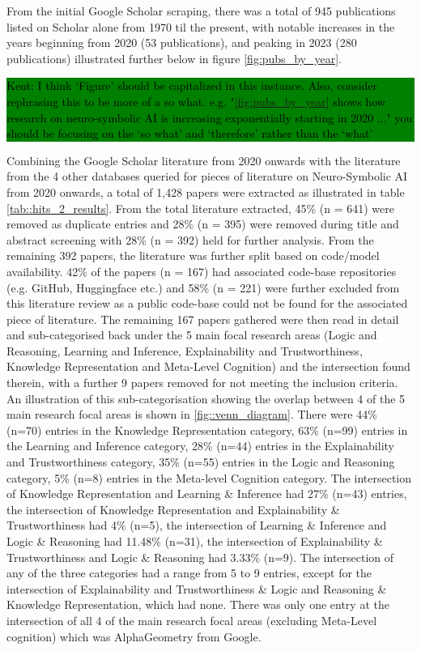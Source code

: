 \documentclass[hf]{ceurart}
\newcommand{\pinaforecomment}[4]{\colorbox{#1}{\textcolor{#4}{\parbox{.8\linewidth}{#2: #3}}}}
\newcommand{\osullikomment}[1]{\pinaforecomment{green}{Kent}{#1}{black}}
\begin{document}
From the initial Google Scholar scraping, there was a total of 945 publications listed on Scholar alone from 1970 til the present, with notable increases in the years beginning from 2020 (53 publications), and peaking in 2023 (280 publications) illustrated further below in figure \ref{fig:pubs_by_year}.
%
\osullikomment{I think `Figure' should be capitalized in this instance. Also, consider rephrasing this to be more of a so what. e.g. "\autoref{fig:pubs_by_year} shows how research on neuro-symbolic AI is increasing exponentially starting in 2020 ..." you should be focusing on the `so what' and `therefore' rather than the `what'} 
%
Combining the Google Scholar literature from 2020 onwards with the literature from the 4 other databases queried for pieces of literature on Neuro-Symbolic AI from 2020 onwards, a total of 1,428 papers were extracted as illustrated in table \ref{tab::hits_2_results}. From the total literature extracted, 45\% (n = 641) were removed as duplicate entries and 28\% (n = 395) were removed during title and abstract screening with 28\% (n = 392) held for further analysis. From the remaining 392 papers, the literature was further split based on code/model availability. 42\% of the papers (n = 167) had associated code-base repositories (e.g. GitHub, Huggingface etc.) and 58\% (n = 221) were further excluded from this literature review as a public code-base could not be found for the associated piece of literature. The remaining 167 papers gathered were then read in detail and sub-categorised back under the 5 main focal research areas (Logic and Reasoning, Learning and Inference, Explainability and Trustworthiness, Knowledge Representation and Meta-Level Cognition) and the intersection found therein, with a further 9 papers removed for not meeting the inclusion criteria. An illustration of this sub-categorisation showing the overlap between 4 of the 5 main research focal areas is shown in \autoref{fig::venn_diagram}. There were 44\% (n=70) entries in the Knowledge Representation category, 63\% (n=99) entries in the Learning and Inference category, 28\% (n=44) entries in the Explainability and Trustworthiness category, 35\% (n=55) entries in the Logic and Reasoning category, 5\% (n=8) entries in the Meta-level Cognition category. The intersection of Knowledge Representation and Learning \& Inference had 27\% (n=43) entries, the intersection of Knowledge Representation and Explainability \& Trustworthiness had 4\% (n=5), the intersection of Learning \& Inference and Logic \& Reasoning had 11.48\% (n=31), the intersection of Explainability \& Trustworthiness and Logic \& Reasoning had 3.33\% (n=9). The intersection of any of the three categories had a range from 5 to 9 entries, except for the intersection of Explainability and Trustworthiness \& Logic and Reasoning \& Knowledge Representation, which had none. There was only one entry at the intersection of all 4 of the main research focal areas (excluding Meta-Level cognition) which was AlphaGeometry from Google\cite{Trinh2024}. 
\end{document}
